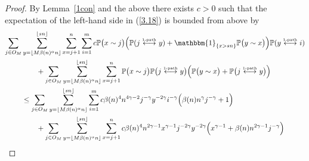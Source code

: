 \documentclass[12pt,a4paper]{article}
\numberwithin{equation}{section}
\begin{document}
\begin{proof}
By Lemma~\ref{1con} and the above there exists  $c>0$ such that the expectation of the left-hand side in (\ref{3.18}) is bounded from above by 
\begin{align*}
    \sum_{j\in O_M} & \sum_{y=\lfloor M \beta(n)^{\alpha}n\rfloor}^{\lfloor sn\rfloor}\sum_{x=j+1}^n \sum_{i=1}^m c  \mathbb P \big( x \sim j \big) \Big(\mathbb P(j\overset{_{1\text{-path}}}{\longleftrightarrow}y) +  \mathbbm{1}_{\{x>sn\}}\mathbb P \big( y \sim x \big)\Big)\mathbb P(y\overset{_{1\text{-path}}}{\longleftrightarrow}i)
    \\ & \qquad+  \sum_{j\in O_M}  \sum_{y=\lfloor M \beta(n)^{\alpha}n\rfloor}^{\lfloor sn\rfloor}\sum_{x=j+1}^n\mathbb P \big( x \sim j \big)\mathbb P \big(j\overset{_{1\text{-path}}}{\longleftrightarrow}y \big)\Big(\mathbb P \big( y \sim  x  \big)+ \mathbb P \big(j\overset{_{1\text{-path}}}{\longleftrightarrow}y \big)\Big)
    \\ & \le \sum_{j\in O_M} \sum_{y=\lfloor M \beta(n)^{\alpha}n\rfloor}^{\lfloor sn\rfloor}\sum_{i=1}^m c \beta(n)^4 n^{4\gamma-2}j^{-\gamma}y^{-2\gamma}i^{-\gamma}\Big(\beta(n)n^\gamma j^{-\gamma}+1 \Big)
      \\ & \qquad +  \sum_{j\in O_M}  \sum_{y=\lfloor M \beta(n)^{\alpha}n\rfloor}^{\lfloor sn\rfloor}\sum_{x=j+1}^n c \beta(n)^4 n^{2\gamma-1} x^{\gamma-1} j^{-2\gamma} y^{-2\gamma}\Big( x^{\gamma-1} + \beta(n)n^{2\gamma-1}j^{-\gamma}\Big)

\end{align*}
\end{proof}
\end{document}
